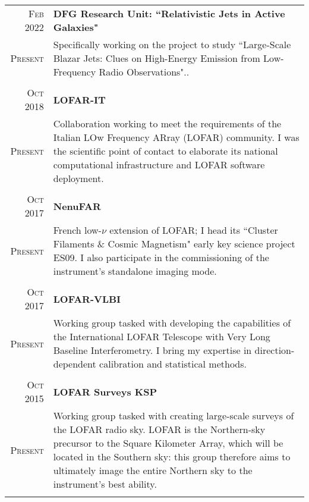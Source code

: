 \documentclass[10pt]{article} %
\begin{document}
\begin{tabular}{r|p{12.5cm}}
	
	\textsc{Feb 2022} & \textbf{DFG Research Unit: ``Relativistic Jets in Active Galaxies"}\\
	\textsc{Present}  & Specifically working on the project to study ``Large-Scale Blazar Jets: Clues on High-Energy Emission from Low-Frequency Radio Observations"..\\
	\multicolumn{2}{c}{} \\
	
	\textsc{Oct 2018} & \textbf{LOFAR-IT}\\
	\textsc{Present}  & Collaboration working to meet the requirements of the Italian LOw Frequency ARray (LOFAR) community. I was the scientific point of contact to elaborate its national computational infrastructure and LOFAR software deployment.\\
	\multicolumn{2}{c}{} \\
	

	\textsc{Oct 2017} & \textbf{NenuFAR}\\
	\textsc{Present}  & French low-$\nu$ extension of LOFAR; I head its ``Cluster Filaments \& Cosmic Magnetism" early key science project ES09. I also participate in the commissioning of the instrument's standalone imaging mode.\\
	\multicolumn{2}{c}{} \\
	
	\textsc{Oct 2017} & \textbf{LOFAR-VLBI}\\
	\textsc{Present}  &  Working group tasked with developing the capabilities of the International LOFAR Telescope with Very Long Baseline Interferometry. I bring my expertise in direction-dependent calibration and statistical methods.\\
	\multicolumn{2}{c}{} \\
	
	\textsc{Oct 2015} & \textbf{LOFAR Surveys KSP}\\
	\textsc{Present}  &  Working group tasked with creating large-scale surveys of the LOFAR radio sky. LOFAR is the Northern-sky precursor to the Square Kilometer Array, which will be located in the Southern sky: this group therefore aims to ultimately image the entire Northern sky to the instrument's best ability.\\
	\multicolumn{2}{c}{} \\
	
\end{tabular}
\end{document}
